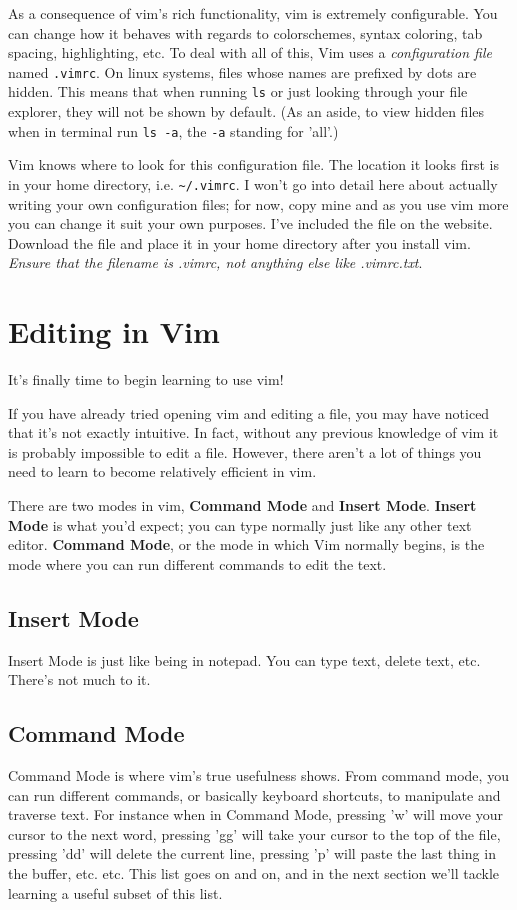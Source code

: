 As a consequence of vim's rich functionality, vim is 
extremely configurable. You can change how it behaves with regards to 
colorschemes, syntax coloring, tab spacing, highlighting, etc. 
To deal with all of this, Vim uses a \emph{configuration file} named 
\texttt{.vimrc}. On linux systems, files whose names are prefixed by dots 
are hidden. This means that when running \texttt{ls}
or just looking through your file explorer, they will not be shown by default.
(As an aside, to view hidden files when in terminal run
\texttt{ls -a}, the \texttt{-a} standing for 'all'.)

Vim knows where to look for this configuration file. The location 
it looks first is in your home directory, i.e. \texttt{\textasciitilde/.vimrc}. I won't
go into detail here about actually writing your own configuration files;
for now, copy mine and as you use vim more you can change it suit
your own purposes. I've included the file on the website. 
Download the file and place it in your home directory after you install vim.
{\em Ensure that the filename is .vimrc, not anything else like .vimrc.txt}.

\section{Editing in Vim}
It's finally time to begin learning to use vim!

If you have already tried opening vim and editing a file, you may have
noticed that it's not exactly intuitive. In fact, without any previous
knowledge of vim it is probably impossible to edit a file. 
However, there aren't a lot of things you need to learn to become
relatively efficient in vim. 

There are two modes in vim, {\bf Command Mode} and {\bf Insert Mode}.
{\bf Insert Mode} is what you'd expect; you can type normally just
like any other text editor. {\bf Command Mode}, or the mode in which
Vim normally begins, is the mode where you can run different commands
to edit the text. 

\subsection{Insert Mode}
Insert Mode is just like being in notepad. You can type text, delete
text, etc. There's not much to it. 

\subsection{Command Mode}
Command Mode is where vim's true usefulness shows. From command mode, you can run
different commands, or basically keyboard shortcuts, to manipulate and traverse
text. For instance when in Command Mode, pressing 'w' will move your cursor
to the next word, pressing 'gg' will take your cursor to the top of the file,
pressing 'dd' will delete the current line, pressing 'p' will paste the last
thing in the buffer, etc. etc. This list goes on and on, and in the next section
we'll tackle learning a useful subset of this list.

